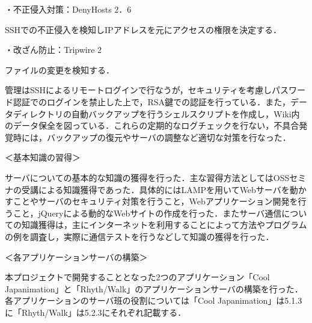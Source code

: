\par
\par ・不正侵入対策：DenyHosts 2．6
\par SSHでの不正侵入を検知しIPアドレスを元にアクセスの権限を決定する．
\par
\par ・改ざん防止：Tripwire 2
\par ファイルの変更を検知する．
\par 
\par
管理はSSHによるリモートログインで行なうが，セキュリティを考慮しパスワード認証でのログインを禁止した上で，RSA鍵での認証を行っている．また，データディレクトリの自動バックアップを行うシェルスクリプトを作成し，Wiki内のデータ保全を図っている．これらの定期的なログチェックを行ない，不具合発覚時には，バックアップの復元やサーバの調整など適切な対策を行なった．
\par 
\par ＜基本知識の習得＞
\par
サーバについての基本的な知識の獲得を行った．主な習得方法としてはOSSセミナの受講による知識獲得であった．具体的にはLAMPを用いてWebサーバを動かすことやサーバのセキュリティ対策を行うこと，Webアプリケーション開発を行うこと，jQueryによる動的なWebサイトの作成を行った．またサーバ通信についての知識獲得は，主にインターネットを利用することによって方法やプログラムの例を調査し，実際に通信テストを行うなどして知識の獲得を行った．
\par ＜各アプリケーションサーバの構築＞
\par
本プロジェクトで開発することとなった2つのアプリケーション「Cool Japanimation」と「Rhyth/Walk」のアプリケーションサーバの構築を行った．各アプリケーションのサーバ班の役割については「Cool Japanimation」は5.1.3に「Rhyth/Walk」は5.2.3にそれぞれ記載する．

